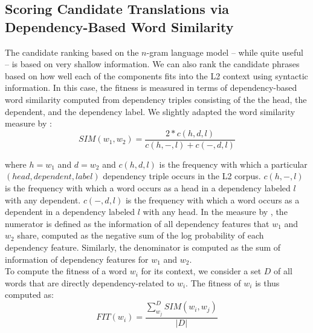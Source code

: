 \documentclass[11pt]{article}
\begin{document}
\subsection{Scoring Candidate Translations via Dependency-Based Word Similarity}
\label{sec:dependencySIM}
The candidate ranking based on the $n$-gram language model -- while quite useful
-- is based on very
shallow information. We can also rank the candidate phrases based on how well
each of the components fits into the L2 context using syntactic information.
In this case, the fitness is measured in terms of dependency-based word
similarity computed from dependency triples consisting of the the head, the
dependent, and the dependency label. We slightly adapted the word similarity
measure by :
\begin{equation}
SIM(w_1,w_2) = \frac{2 * c(h,d,l)} 
{c(h,-,l) + c(-,d,l)}
\end{equation}

\noindent
where $h=w_1$ and $d=w_2$ and 
$c(h,d,l)$ is the frequency with which a particular $(head, dependent, label)$
dependency triple occurs in the L2 corpus.
$c(h,-,l)$ is the frequency with which a word occurs as a head in a dependency
labeled $l$ with any dependent. $c(-,d,l)$ is the frequency with which a word
occurs as a dependent in a dependency labeled $l$  with any head. 
In the  measure by , the numerator is defined as the information of all dependency features that $w_1$ and $w_2$ share, computed as the negative sum of the log probability of each dependency feature. Similarly, the denominator is computed as the sum of information of dependency features for $w_1$ and $w_2$. \\

To compute the fitness of a word $w_i$ for its context, we consider a set $D$ of all words that are directly dependency-related to $w_i$. The fitness of $w_i$ is thus computed as:\\
\begin{equation}
FIT(w_i) =  \frac {  \sum_{w_j}^{D} SIM(w_i,w_j) } {  |D|}
\end{equation}
\end{document}
